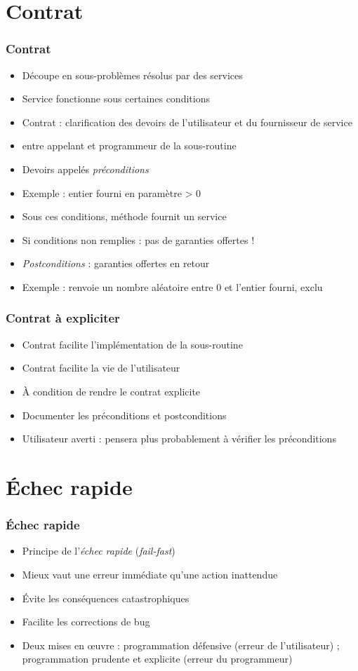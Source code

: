 \documentclass[english, french]{beamer}
\begin{document}
\section{Contrat}
\begin{frame}
	\frametitle{Contrat}
	\begin{itemize}
		\item Découpe en sous-problèmes résolus par des services
		\item Service fonctionne sous certaines conditions
		\item Contrat : clarification des devoirs de l’utilisateur et du fournisseur de service
		\item entre appelant et programmeur de la sous-routine
		\item Devoirs appelés \emph{préconditions}
		\item Exemple : entier fourni en paramètre > 0
		\item Sous ces conditions, méthode fournit un service
		\item Si conditions non remplies : pas de garanties offertes !
		\item \emph{Postconditions} : garanties offertes en retour
		\item Exemple : renvoie un nombre aléatoire entre 0 et l’entier fourni, exclu
	\end{itemize}
\end{frame}

\begin{frame}
	\frametitle{Contrat à expliciter}
	\begin{itemize}
		\item Contrat facilite l’implémentation de la sous-routine
		\item Contrat facilite la vie de l’utilisateur
		\item À condition de rendre le contrat explicite
		\item Documenter les préconditions et postconditions
		\item Utilisateur averti : pensera plus probablement à vérifier les préconditions
	\end{itemize}
\end{frame}

\section{Échec rapide}
\begin{frame}
	\frametitle{Échec rapide}
	\begin{itemize}
		\item Principe de l’\emph{échec rapide} (\emph{fail-fast})
		\item Mieux vaut une erreur immédiate qu’une action inattendue
		\item Évite les conséquences catastrophiques
		\item Facilite les corrections de bug
		\item Deux mises en œuvre : programmation défensive (erreur de l’utilisateur) ; programmation prudente et explicite (erreur du programmeur)
	\end{itemize}
\end{frame}
\end{document}
